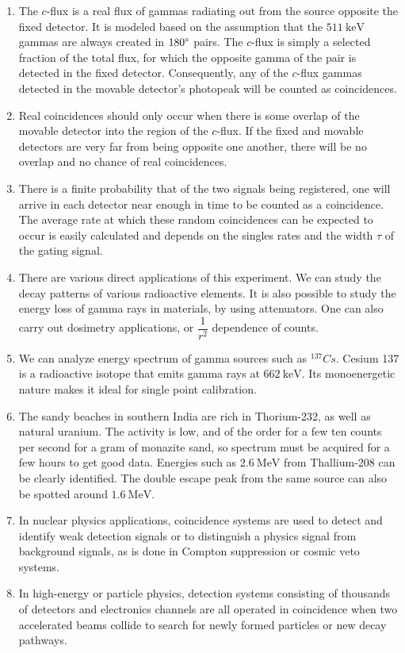 \documentclass[%
 reprint,
nofootinbib,
 amsmath,amssymb,
 aps,
floatfix,
]{revtex4-2}
\begin{document}
\begin{enumerate}
        \item The $c$-flux is a real flux of gammas radiating out from the source opposite the fixed detector. It is modeled based on the assumption that the $\SI{511}{\kilo \electronvolt}$ gammas are always created in $180 \degree$ pairs. The $c$-flux is simply a selected fraction of the total flux, for which the opposite gamma of the pair is detected in the fixed detector. Consequently, any of the $c$-flux gammas detected in the movable detector's photopeak will be counted as coincidences.
        \item Real coincidences should only occur when there is some overlap of the movable detector into the region of the $c$-flux. If the fixed and movable detectors are very far from being opposite one another, there will be no overlap and no chance of real coincidences.
        \item There is a finite probability that of the two signals being registered, one will arrive in each detector near enough in time to be counted as a coincidence. The average rate at which these random coincidences can be expected to occur is easily calculated and depends on the singles rates and the width $\tau$ of the gating signal.
        \item There are various direct applications of this experiment. We can study the decay patterns of various radioactive elements. It is also possible to study the energy loss of gamma rays in materials, by using attenuators. One can also carry out dosimetry applications, or $\dfrac{1}{r^2}$ dependence of counts.
        \item We can analyze energy spectrum of gamma sources such as $^{137} Cs$. Cesium 137 is a radioactive isotope that emits gamma rays at $\SI{662}{\kilo \electronvolt}$. Its monoenergetic nature makes it ideal for single point calibration.
        \item The sandy beaches in southern India are rich in Thorium-232, as well as natural uranium. The activity is low, and of the order for a few ten counts per second for a gram of monazite sand, so spectrum must be acquired for a few hours to get good data. Energies such as $\SI{2.6}{\mega \electronvolt}$ from Thallium-208 can be clearly identified. The double escape peak from the same source can also be spotted around $\SI{1.6}{\mega \electronvolt}$.
        \item In nuclear physics applications, coincidence systems are used to detect and identify weak detection signals or to distinguish a physics signal from background signals, as is done in Compton suppression or cosmic veto systems.
        \item In high-energy or particle physics, detection systems consisting of thousands of detectors and electronics channels are all operated in coincidence when two accelerated beams collide to search for newly formed particles or new decay pathways.
    \end{enumerate}
\end{document}
